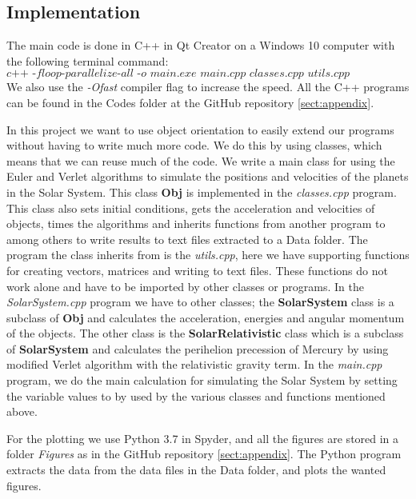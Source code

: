 \documentclass[12pt,a4paper,english]{article}
\begin{document}
\subsection{Implementation}
\label{subsect:Implementation}
The main code is done in C++ in Qt Creator on a Windows 10 computer with the following terminal command: \[\textit{c++ -floop-parallelize-all -o main.exe main.cpp classes.cpp utils.cpp SolarSystem.cpp}\]
We also use the \textit{-Ofast} compiler flag to increase the speed. All the C++ programs can be found in the Codes folder at the GitHub repository \ref{sect:appendix}.

In this project we want to use object orientation to easily extend our programs without having to write much more code. We do this by using classes, which means that we can reuse much of the code. We write a main class for using the Euler and Verlet algorithms to simulate the positions and velocities of the planets in the Solar System. This class \textbf{Obj} is implemented in the \textit{classes.cpp} program. This class also sets initial conditions, gets the acceleration and velocities of objects, times the algorithms and inherits functions from another program to among others to write results to text files extracted to a Data folder. The program the class inherits from is the \textit{utils.cpp}, here we have supporting functions for creating vectors, matrices and writing to text files. These functions do not work alone and have to be imported by other classes or programs. In the \textit{SolarSystem.cpp} program we have to other classes; the \textbf{SolarSystem} class is a subclass of \textbf{Obj} and calculates the acceleration, energies and angular momentum of the objects. The other class is the \textbf{SolarRelativistic} class which is a subclass of \textbf{SolarSystem} and calculates the perihelion precession of Mercury by using modified Verlet algorithm with the relativistic gravity term. In the \textit{main.cpp} program, we do the main calculation for simulating the Solar System by setting the variable values to by used by the various classes and functions mentioned above.

For the plotting we use Python 3.7 in Spyder, and all the figures are stored in a folder \textit{Figures} as in the GitHub repository \ref{sect:appendix}. The Python program extracts the data from the data files in the Data folder, and plots the wanted figures.
\end{document}
